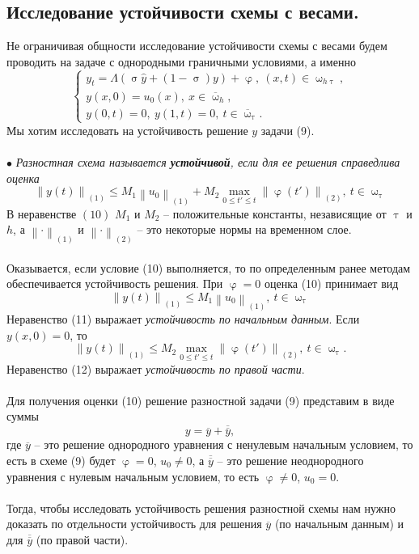 \documentclass[a4paper, 12pt]{report}
\numberwithin{equation}{section}
\newcommand{\ol}{\overline}
\renewcommand{\leq}{\leqslant}
\renewcommand{\varphi}{\upvarphi}
\renewcommand{\phi}{\upvarphi}
\renewcommand{\tau}{\uptau}
\renewcommand{\sigma}{\upsigma}
\renewcommand{\omega}{\upomega}
\newcommand\Norm[1]{\left\| #1 \right\|}
\begin{document}
	\subsection{Исследование устойчивости схемы с весами.}
	Не ограничивая общности исследование устойчивости схемы с весами будем проводить на задаче с однородными граничными условиями, а именно
	\begin{equation}
		\begin{cases}
			y_t = \Lambda(\sigma \hat y + (1-\sigma)y)+\varphi,\ (x,t)\in \omega_{h\tau},\\
			y(x,0) = u_0(x),\ x \in \ol \omega_h,\\
			y(0, t) = 0,\ y(1,t) = 0,\ t \in \ol \omega_\tau.
		\end{cases}
	\end{equation}
	Мы хотим исследовать на устойчивость решение $y$ задачи (9). \\\\
	$\bullet$ \textit{Разностная схема называется \textbf{устойчивой}, если для ее решения справедлива оценка}
	\begin{equation}
		\Norm{y(t)}_{(1)}\leq M_1 \Norm{u_0}_{(1)} + M_2 \underset{0 \leq t' \leq t}{\max}\Norm{\varphi(t')}_{(2)},\ t \in \omega_\tau
	\end{equation}
	В неравенстве $(10)$ $M_1$ и $M_2$ -- положительные константы, независящие от $\tau$ и $h$, а $\Norm{\cdot}_{(1)}$ и $\Norm{\cdot}_{(2)}$ -- это некоторые нормы на временном слое. \\\\
	Оказывается, если условие (10) выполняется, то по определенным ранее методам обеспечивается устойчивость решения. При $\varphi = 0$ оценка (10) принимает вид
	\begin{equation}
		\Norm{y(t)}_{(1)}\leq M_1 \Norm{u_0}_{(1)},\ t \in \omega_\tau
	\end{equation}
	Неравенство (11) выражает \textit{устойчивость по начальным данным}. Если $y(x,0) = 0$, то \begin{equation}
		\Norm{y(t)}_{(1)}\leq M_2 \underset{0 \leq t' \leq t}{\max}\Norm{\varphi(t')}_{(2)},\ t \in \omega_\tau.
	\end{equation}
	Неравенство (12) выражает \textit{устойчивость по правой части}.
	\\\\
	Для получения оценки (10) решение разностной задачи (9) представим в виде суммы
	\begin{equation*}
		y = \ol y + \ol{\ol y}, 
	\end{equation*}
	где $\ol y$ -- это решение однородного уравнения с ненулевым начальным условием, то есть в схеме (9) будет $\phi = 0$, $u_0 \ne 0$, а $\ol{\ol y}$ -- это решение неоднородного уравнения с нулевым начальным условием, то есть $\phi \ne 0$, $u_0 = 0$.
	\\\\
	Тогда, чтобы исследовать устойчивость решения разностной схемы нам нужно доказать по отдельности устойчивость для решения $\ol y$ (по начальным данным) и для $\ol{\ol y}$ (по правой части). 
\end{document}
